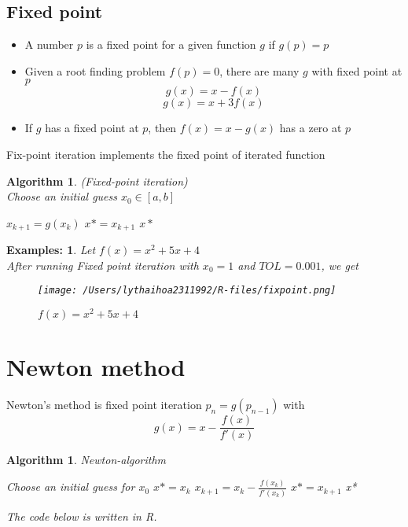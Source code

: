 \documentclass[12pt]{article}
\newtheorem{alg}[theorem]{Algorithm}
\newtheorem*{ex}{Examples:}
\begin{document}
\subsection{Fixed point} \begin{itemize}
	\item A number $p$ is a fixed point for a given function $g$ if $g(p) = p$
	\item Given a root finding problem $f(p) = 0$, there are many $g$ with fixed point at $p$
	$$g(x) = x - f(x)$$ $$g(x) = x + 3f(x)$$
	\item If $g$ has a fixed point at $p$, then $f(x) = x -g(x)$ has a zero at $p$
\end{itemize}
Fix-point iteration implements the fixed point of iterated function \\ 
\begin{alg}(Fixed-point iteration) \\
Choose an initial guess $x_0 \in [a,b]$
\begin{algorithmic}
\State $x_{k+1} = g(x_k)$
\State $x* = x_{k+1}$
\State \Return $x*$
\EndIf
\EndFor
\end{algorithmic}

\end{alg}
\begin{ex}
Let $f(x) = x^2 + 5x +4$ \\
After running Fixed point iteration with $x_0 = 1$ and $TOL = 0.001$, we get 	\\
\begin{figure}[H]
\centering 
\texttt{[image: /Users/lythaihoa2311992/R-files/fixpoint.png]}
\caption{$f(x) = x^2 +5x +4$}	
\end{figure}	
\end{ex}


\section{Newton method}
Newton's method is fixed point iteration $p_n = g(p_{n-1})$ with $$g(x) = x - \frac{f(x)}{f'(x)}$$
\begin{alg}{Newton-algorithm}
\begin{algorithmic}
Choose an initial guess for $x_0$
\State $x* = x_{k}$
\State $x_{k+1} = x_k - \frac{f(x_k)}{f'(x_k)}$
\State $x* = x_{k+1}$
\State \Return x*
\EndIf
\EndFor	
\end{algorithmic}
The code below is written in R.
	
\end{alg}
\end{document}
